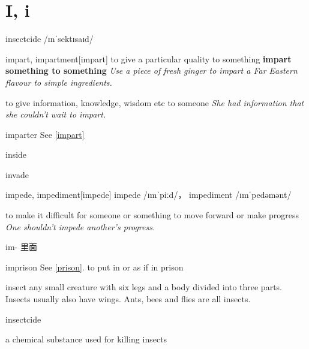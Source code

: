 \section{I, i}

\begin{word}{insectcide}
    /ɪnˈsektɪsaɪd/
\end{word}

\begin{word}{impart, impartment}[impart]
    to give a particular quality to something
    \textbf{impart something to something}
    \textit{Use a piece of fresh ginger to impart a Far Eastern flavour to simple ingredients.}

    to give information, knowledge, wisdom etc to someone
    \textit{She had information that she couldn’t wait to impart.}
\end{word}

\begin{word}{imparter}
    See \ref{impart}
\end{word}

\begin{word}{inside}
\end{word}

\begin{word}{invade}
\end{word}

\begin{word}{impede, impediment}[impede]
    impede /ɪmˈpiːd/， impediment /ɪmˈpedəmənt/ 

    to make it difficult for someone or something to move forward or make progress
    \textit{One shouldn't impede another's progress.}

    im- 里面
\end{word}

\begin{word}{imprison}
    See \ref{prison}.
    to put in or as if in prison
\end{word}

\begin{word}{insect}
    any small creature with six legs and a body divided into three parts. Insects usually also have wings. Ants, bees and flies are all insects.
\end{word}

\begin{word}{insectcide}
    
    a chemical substance used for killing insects
\end{word}

